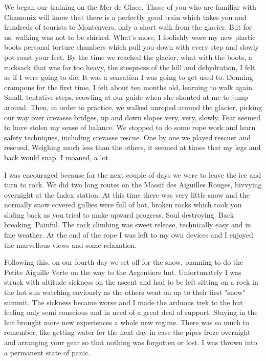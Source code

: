 \documentclass[a5paper,openany,font 10pt]{scrbook}
\begin{document}
We began our training on the Mer de Glace. Those of you who
are familiar with Chamonix will know that there is a perfectly
good train which takes you  and hundreds of tourists  to
Montenvers, only a short walk from the glacier. But for us,
walking was not to be shirked. What's more, I foolishly wore my
new plastic boots   personal torture chambers which pull you down
with every step and slowly pot roast your feet. By the time we
reached the glacier, what with the boots, a rucksack that was far
too heavy, the steepness of the hill and dehydration, I felt as
if I were going to die. It was a sensation I was going to get
used to. Donning crampons for the first time, I felt about ten
months old, learning to walk again. Small, tentative steps,
scowling at our guide when she shouted at me to jump around.
Then, in order to practice, we walked unroped around the glacier,
picking our way over crevasse bridges, up and down slopes   very,
very, slowly. Fear seemed to have stolen my sense of balance. We
stopped to do some rope work and learn safety techniques,
including crevasse rescue. One by one we played rescuer and
rescued. Weighing much less than the others, it seemed at times
that my legs and back would snap. I moaned, a lot.

I was encouraged because for the next couple of days we were
to leave the ice and turn to rock. We did two long routes on the
Massif des Aiguilles Rouges, bivvying overnight at the Index
station. At this time there was very little snow and the normally
snow covered gullies were full of hot, broken rocks which took
you sliding back as you tried to make upward progress. Soul
destroying. Back breaking. Painful. The rock climbing was sweet
release, technically easy and in fine weather. At the end of the
rope I was left to my own devices and I enjoyed the marvellous
views and some relaxation.

Following this, on our fourth day we set off for the snow,
planning to do the Petite Aiguille Verte on the way to the
Argentiere hut. Unfortunately I was struck with altitude sickness
on the ascent and had to be left sitting on a rock in the hot sun
watching enviously as the others went on up to their first "snow"
summit. The sickness became worse and I made the arduous trek to
the hut feeling only semi conscious and in need of a great deal
of support. Staying in the hut brought more new experiences   a
whole new regime. There was so much to remember, like getting
water for the next day in case the pipes froze overnight and
arranging your gear so that nothing was forgotten or lost. I was
thrown into a permanent state of panic.
\end{document}
